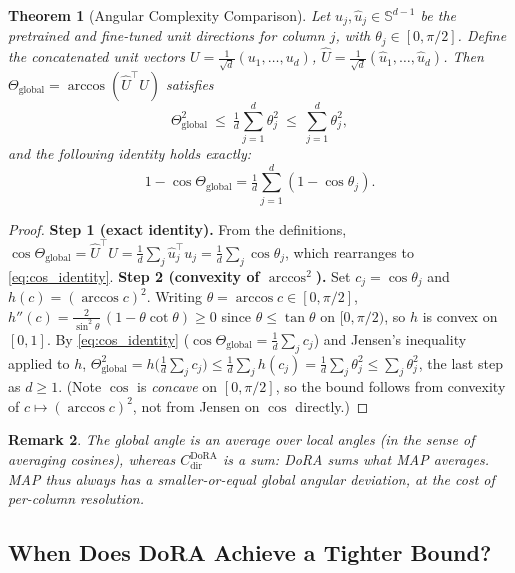 \documentclass[10pt]{article}
\newtheorem{theorem}{Theorem}[section]
\newtheorem{remark}[theorem]{Remark}
\newcommand{\Sd}{\mathbb{S}^{d-1}}
\newcommand{\Thetaglob}{\Theta_{\mathrm{global}}}
\begin{document}
\setcounter{theorem}{9} %
\begin{theorem}[Angular Complexity Comparison]\label{thm:comparison}
Let $u_j,\hat u_j\in\Sd$ be the pretrained and fine-tuned unit directions for column
$j$, with $\theta_j\in[0,\pi/2]$. Define the concatenated unit vectors
$U=\frac1{\sqrt d}(u_1,\dots,u_d)$, $\hat U=\frac1{\sqrt d}(\hat u_1,\dots,\hat u_d)$.
Then $\Thetaglob=\arccos(\hat U^\top U)$ satisfies
\begin{equation}\label{eq:thm_comparison}
\Thetaglob^2\ \le\ \tfrac1d\sum_{j=1}^d\theta_j^2\ \le\ \sum_{j=1}^d\theta_j^2,
\end{equation}
and the following identity holds \emph{exactly}:
\begin{equation}\label{eq:cos_identity}
1-\cos\Thetaglob=\tfrac1d\sum_{j=1}^d(1-\cos\theta_j).
\end{equation}
\end{theorem}
\begin{proof}
\textbf{Step 1 (exact identity).} From the definitions,
$\cos\Thetaglob=\hat U^\top U=\frac1d\sum_j\hat u_j^\top u_j=\frac1d\sum_j\cos\theta_j$,
which rearranges to \eqref{eq:cos_identity}.
\textbf{Step 2 (convexity of $\arccos^2$).} Set $c_j=\cos\theta_j$ and $h(c)=(\arccos c)^2$.
Writing $\theta=\arccos c\in[0,\pi/2]$, $h''(c)=\frac{2}{\sin^2\theta}\,(1-\theta\cot\theta)\ge0$
since $\theta\le\tan\theta$ on $[0,\pi/2)$, so $h$ is convex on $[0,1]$. By \eqref{eq:cos_identity}
($\cos\Thetaglob=\frac1d\sum_j c_j$) and Jensen's inequality applied to $h$,
$\Thetaglob^2=h\!\big(\tfrac1d\sum_j c_j\big)\le\tfrac1d\sum_j h(c_j)=\tfrac1d\sum_j\theta_j^2\le\sum_j\theta_j^2$,
the last step as $d\ge1$. (Note $\cos$ is \emph{concave} on $[0,\pi/2]$, so the bound
follows from convexity of $c\mapsto(\arccos c)^2$, not from Jensen on $\cos$ directly.)
\end{proof}

\begin{remark}\label{rem:comparison}
The global angle is an \emph{average} over local angles (in the sense of averaging
cosines), whereas $C^{\mathrm{DoRA}}_{\mathrm{dir}}$ is a \emph{sum}: DoRA sums what
MAP averages. MAP thus always has a smaller-or-equal global angular deviation, at the
cost of per-column resolution.
\end{remark}

\subsection{When Does DoRA Achieve a Tighter Bound?}
\label{sec:dora_advantage}
\end{document}
